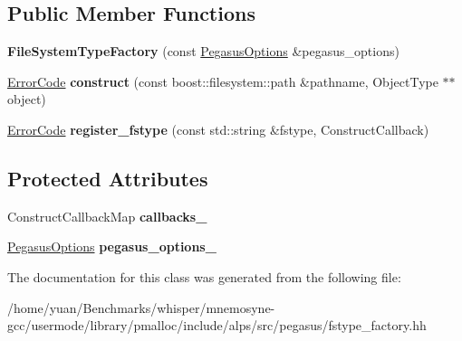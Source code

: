 \subsection*{Public Member Functions}
\begin{DoxyCompactItemize}
\item 
{\bfseries File\+System\+Type\+Factory} (const \hyperlink{structalps_1_1PegasusOptions}{Pegasus\+Options} \&pegasus\+\_\+options)\hypertarget{classalps_1_1FileSystemTypeFactory_a1466c1689d4b9c4da885524fab0c4c61}{}\label{classalps_1_1FileSystemTypeFactory_a1466c1689d4b9c4da885524fab0c4c61}

\item 
\hyperlink{group__ERRORCODES_ga6263a3c9a0b8d36aea21cdd835ac99fe}{Error\+Code} {\bfseries construct} (const boost\+::filesystem\+::path \&pathname, Object\+Type $\ast$$\ast$object)\hypertarget{classalps_1_1FileSystemTypeFactory_ad29eb6817e32392477d54bb8d4a00a5b}{}\label{classalps_1_1FileSystemTypeFactory_ad29eb6817e32392477d54bb8d4a00a5b}

\item 
\hyperlink{group__ERRORCODES_ga6263a3c9a0b8d36aea21cdd835ac99fe}{Error\+Code} {\bfseries register\+\_\+fstype} (const std\+::string \&fstype, Construct\+Callback)\hypertarget{classalps_1_1FileSystemTypeFactory_aeb8d8c62187c4d6a9338be6b7bd2cec4}{}\label{classalps_1_1FileSystemTypeFactory_aeb8d8c62187c4d6a9338be6b7bd2cec4}

\end{DoxyCompactItemize}
\subsection*{Protected Attributes}
\begin{DoxyCompactItemize}
\item 
Construct\+Callback\+Map {\bfseries callbacks\+\_\+}\hypertarget{classalps_1_1FileSystemTypeFactory_ab0e19021185da56a6b7c4c3c9c30a346}{}\label{classalps_1_1FileSystemTypeFactory_ab0e19021185da56a6b7c4c3c9c30a346}

\item 
\hyperlink{structalps_1_1PegasusOptions}{Pegasus\+Options} {\bfseries pegasus\+\_\+options\+\_\+}\hypertarget{classalps_1_1FileSystemTypeFactory_a7a2c7e28160c6a42fa56c2f695766be5}{}\label{classalps_1_1FileSystemTypeFactory_a7a2c7e28160c6a42fa56c2f695766be5}

\end{DoxyCompactItemize}


The documentation for this class was generated from the following file\+:\begin{DoxyCompactItemize}
\item 
/home/yuan/\+Benchmarks/whisper/mnemosyne-\/gcc/usermode/library/pmalloc/include/alps/src/pegasus/fstype\+\_\+factory.\+hh\end{DoxyCompactItemize}
